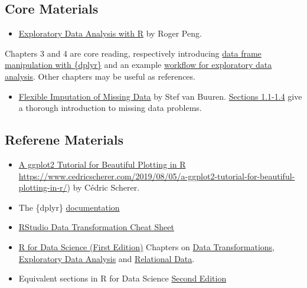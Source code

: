 \documentclass[
  12pt,
]{book}
\providecommand{\tightlist}{%
  \setlength{\itemsep}{0pt}\setlength{\parskip}{0pt}}
\begin{document}
\hypertarget{core-materials-2}{%
\subsection*{Core Materials}\label{core-materials-2}}

\begin{itemize}
\tightlist
\item
  \href{https://bookdown.org/rdpeng/exdata/}{Exploratory Data Analysis with R} by Roger Peng.
\end{itemize}

Chapters 3 and 4 are core reading, respectively introducing \href{https://bookdown.org/rdpeng/exdata/managing-data-frames-with-the-dplyr-package.html}{data frame manipulation with \{dplyr\}} and an example \href{https://bookdown.org/rdpeng/exdata/exploratory-data-analysis-checklist.html}{workflow for exploratory data analysis}. Other chapters may be useful as references.

\begin{itemize}
\tightlist
\item
  \href{https://stefvanbuuren.name/fimd/}{Flexible Imputation of Missing Data} by Stef van Buuren. \href{https://stefvanbuuren.name/fimd/ch-introduction.html}{Sections 1.1-1.4} give a thorough introduction to missing data problems.
\end{itemize}

\hypertarget{referene-materials}{%
\subsection*{Referene Materials}\label{referene-materials}}

\begin{itemize}
\item
  \href{}{A ggplot2 Tutorial for Beautiful Plotting in R} \url{https://www.cedricscherer.com/2019/08/05/a-ggplot2-tutorial-for-beautiful-plotting-in-r/}) by Cédric Scherer.
\item
  The \{dplyr\} \href{https://dplyr.tidyverse.org/}{documentation}
\item
  \href{https://github.com/rstudio/cheatsheets/blob/main/data-transformation.pdf}{RStudio Data Transformation Cheat Sheet}
\item
  \href{https://r4ds.had.co.nz/index.html}{R for Data Science (First Edition)} Chapters on \href{https://r4ds.had.co.nz/transform.html}{Data Transformations}, \href{https://r4ds.had.co.nz/exploratory-data-analysis.html}{Exploratory Data Analysis} and \href{https://r4ds.had.co.nz/relational-data.html}{Relational Data}.
\item
  Equivalent sections in R for Data Science \href{https://r4ds.hadley.nz/}{Second Edition}
\end{itemize}
\end{document}
